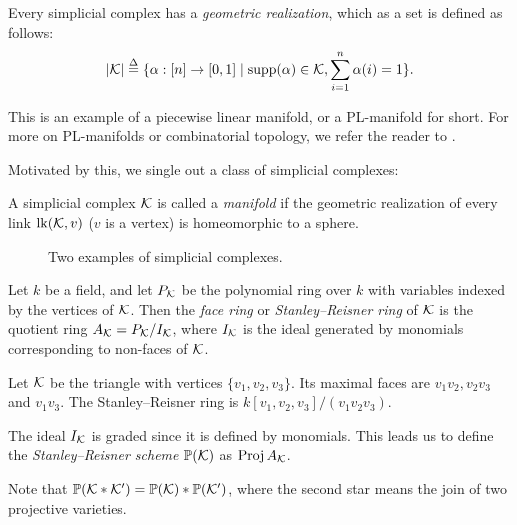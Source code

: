 Every simplicial complex has a \emph{geometric realization}, which as a set is defined as follows:
$$
|\mathcal{K}| \stackrel{\Delta}{=}  \{ \alpha: [n] \to [0,1] \mid \operatorname{{supp}}(\alpha) \in \mathcal{K}, \sum_{i=1}^n \alpha(i) = 1 \}.
$$

This is an example of a piecewise linear manifold, or a PL-manifold for short. For more on PL-manifolds or combinatorial topology, we refer the reader to \cite{glaser_combtop,spanier_topology,hudson_pl}.

Motivated by this, we single out a class of simplicial complexes:

\begin{definition}
A simplicial complex $\mathcal{K}$ is called a \emph{manifold} if the geometric realization of every link $\mathrm{lk}(\mathcal{K},v)$ ($v$ is a vertex) is homeomorphic to a sphere.
\end{definition}

\begin{figure}[b]
\centering 
\hspace*{\fill}%
 \hspace*{\fill}%
 \hspace*{\fill}%
\caption{Two examples of simplicial complexes.}
\end{figure}

Let $k$ be a field, and let $P_{\mathcal{K}}$ be the polynomial ring over $k$ with variables indexed by the vertices of $\mathcal{K}$. Then the \emph{face ring} or \emph{Stanley--Reisner ring} of $\mathcal{K}$ is the quotient ring $A_{\mathcal{K}} = P_{\mathcal{K}}/I_{\mathcal{K}}$, where $I_{\mathcal{K}}$ is the ideal generated by monomials corresponding to non-faces of $\mathcal{K}$. 

\begin{example}
Let $\mathcal{K}$ be the triangle with vertices $\{ v_1,v_2,v_3\}$. Its maximal faces are $v_1v_2, v_2v_3$ and $v_1v_3$. The Stanley--Reisner ring is $k[v_1,v_2,v_3]/(v_1v_2v_3)$.
\end{example}

The ideal $I_{\mathcal{K}}$ is graded since it is defined by monomials. This leads us to define the \emph{Stanley--Reisner scheme} $\mathbb{P}(\mathcal{K})$ as $\operatorname{Proj} A_{\mathcal{K}}$. 

Note that $\mathbb{P}(\mathcal{K} \ast \mathcal{K}') = \mathbb{P}(\mathcal{K}) \ast \mathbb{P}(\mathcal{K}')$, where the second star means the join of two projective varieties.

